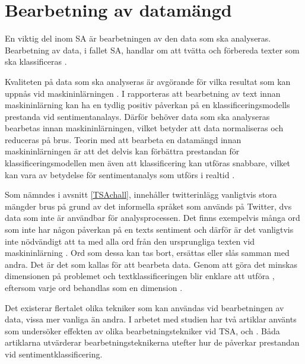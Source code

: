 \documentclass{kaumasters} %
\begin{document}
\section{Bearbetning av datamängd} \label{exp:pre}
En viktig del inom SA är bearbetningen av den data som ska analyseras. Bearbetning av data, i fallet SA, handlar om att tvätta och förbereda texter som ska klassificeras \cite{effrosynidis2017comparison}. 

Kvaliteten på data som ska analyseras är avgörande för vilka resultat som kan uppnås vid maskininlärningen \cite{effrosynidis2017comparison}. I \cite{HADDI201326} rapporteras att bearbetning av text innan maskininlärning kan ha en tydlig positiv påverkan på en klassificeringsmodells prestanda vid sentimentanalays. Därför behöver data som ska analyseras bearbetas innan maskininlärningen, vilket betyder att data normaliseras och reduceras på brus. Teorin med att bearbeta en datamängd innan maskininlärningen är att det delvis kan förbättra prestandan för klassificeringsmodellen men även att  klassificering kan utföras snabbare, vilket kan vara av betydelse för sentimentanalys som utförs i realtid \cite{7862202}. 

Som nämndes i avsnitt \ref{TSAchall}, innehåller twitterinlägg vanligtvis stora mängder brus på grund av det informella språket som används på Twitter, dvs data som inte är användbar för analysprocessen. Det finns exempelvis många ord som inte har någon påverkan på en texts sentiment och därför är det vanligtvis inte nödvändigt att ta med alla ord från den ursprungliga texten vid maskininlärning \cite{effrosynidis2017comparison, HADDI201326}. Ord som dessa kan tas bort, ersättas eller slås samman med andra. Det är det som kallas för att bearbeta data. Genom att göra det minskas dimensionen på problemet och textklassificeringen blir enklare att utföra , eftersom varje ord behandlas som en dimension \cite{HADDI201326}. 

Det existerar flertalet olika tekniker som kan användas vid bearbetningen av data, vissa mer vanliga än andra. I arbetet med studien har två artiklar använts som undersöker effekten av olika bearbetningstekniker vid TSA, \cite{effrosynidis2017comparison} och \cite{7862202}. Båda artiklarna utvärderar bearbetningsteknikerna utefter hur de påverkar prestandan vid sentimentklassificering.
\end{document}
